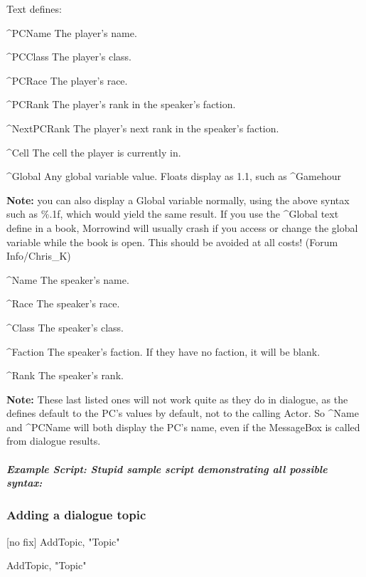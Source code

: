 Text defines:

\^{}PCName The player's name.

\^{}PCClass The player's class.

\^{}PCRace The player's race.

\^{}PCRank The player's rank in the speaker's faction.

\^{}NextPCRank The player's next rank in the speaker's faction.

\^{}Cell The cell the player is currently in.

\^{}Global Any global variable value. Floats display as 1.1, such as
\^{}Gamehour

\textbf{Note:} you can also display a Global variable normally, using
the above syntax such as \%.1f, which would yield the same result. If
you use the \^{}Global text define in a book, Morrowind will usually
crash if you access or change the global variable while the book is
open. This should be avoided at all costs! (Forum Info/Chris\_K)

\^{}Name The speaker's name.

\^{}Race The speaker's race.

\^{}Class The speaker's class.

\^{}Faction The speaker's faction. If they have no faction, it will be
blank.

\^{}Rank The speaker's rank.

\textbf{Note:} These last listed ones will not work quite as they do in
dialogue, as the defines default to the PC's values by default, not to
the calling Actor. So \^{}Name and \^{}PCName will both display the PC's
name, even if the MessageBox is called from dialogue results.

\hypertarget{example-script-stupid-sample-script-demonstrating-all-possible-syntax}{%
\subparagraph{Example Script: Stupid sample script demonstrating all
possible
syntax:}\label{example-script-stupid-sample-script-demonstrating-all-possible-syntax}}




\hypertarget{adding-a-dialogue-topic}{%
\subsubsection{Adding a dialogue topic}\label{adding-a-dialogue-topic}}

{[}no fix{]} AddTopic, "Topic"

AddTopic, "Topic"

